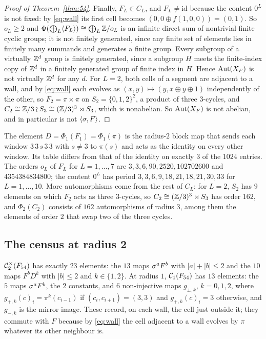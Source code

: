 \begin{proof}[Proof of Theorem~\ref{thm:54}]
Finally, $F_L\in C_L$, and $F_L\ne\mathrm{id}$ because the content $0^L$ is not fixed: by \eqref{eq:wall} its first cell becomes $(0,0\oplus f(1,0,0))=(0,1)$. So $o_L\ge2$ and $\Phi(\bigoplus_L\langle F_L\rangle)\cong\bigoplus_L\mathbb{Z}/o_L$ is an infinite direct sum of nontrivial finite cyclic groups; it is not finitely generated, since any finite set of elements lies in finitely many summands and generates a finite group. Every subgroup of a virtually $\mathbb{Z}^d$ group is finitely generated, since a subgroup $H$ meets the finite-index copy of $\mathbb{Z}^d$ in a finitely generated group of finite index in $H$. Hence $\operatorname{Aut}(X_F)$ is not virtually $\mathbb{Z}^d$ for any $d$. For $L=2$, both cells of a segment are adjacent to a wall, and by \eqref{eq:wall} each evolves as $(x,y)\mapsto(y,x\oplus y\oplus1)$ independently of the other, so $F_2=\pi\times\pi$ on $S_2=\{0,1,2\}^2$, a product of three $3$-cycles, and $C_2\cong\mathbb{Z}/3\wr S_3\cong(\mathbb{Z}/3)^3\rtimes S_3$, which is nonabelian. So $\operatorname{Aut}(X_F)$ is not abelian, and in particular is not $\langle\sigma,F\rangle$.
\end{proof}

The element $D=\Phi_1(F_1)=\Phi_1(\pi)$ is the radius-$2$ block map that sends each window $3\,3\,s\,3\,3$ with $s\ne3$ to $\pi(s)$ and acts as the identity on every other window. Its table differs from that of the identity on exactly $3$ of the $1024$ entries. The orders $o_L$ of $F_L$ for $L=1,\dots,7$ are $3,3,6,90,2520,102702600$ and $4354384834800$; the content $0^L$ has period $3,3,6,9,18,21,18,21,30,33$ for $L=1,\dots,10$. More automorphisms come from the rest of $C_L$: for $L=2$, $S_2$ has $9$ elements on which $F_2$ acts as three $3$-cycles, so $C_2\cong(\mathbb{Z}/3)^3\rtimes S_3$ has order $162$, and $\Phi_2(C_2)$ consists of $162$ automorphisms of radius $3$, among them the elements of order $2$ that swap two of the three cycles.

\subsection{The census at radius 2}

\begin{theorem}\label{thm:54census}
$\mathcal{C}^{\times}_2(F_{54})$ has exactly $23$ elements: the $13$ maps $\sigma^aF^b$ with $|a|+|b|\le2$ and the $10$ maps $F^bD^k$ with $|b|\le2$ and $k\in\{1,2\}$. At radius $1$, $\mathcal{C}_1(F_{54})$ has $13$ elements: the $5$ maps $\sigma^aF^b$, the $2$ constants, and $6$ non-injective maps $g_{\pm,k}$, $k=0,1,2$, where $g_{+,k}(c)_i=\pi^k(c_{i-1})$ if $(c_i,c_{i+1})=(3,3)$ and $g_{+,k}(c)_i=3$ otherwise, and $g_{-,k}$ is the mirror image. These record, on each wall, the cell just outside it; they commute with $F$ because by \eqref{eq:wall} the cell adjacent to a wall evolves by $\pi$ whatever its other neighbour is. 
\end{theorem}

